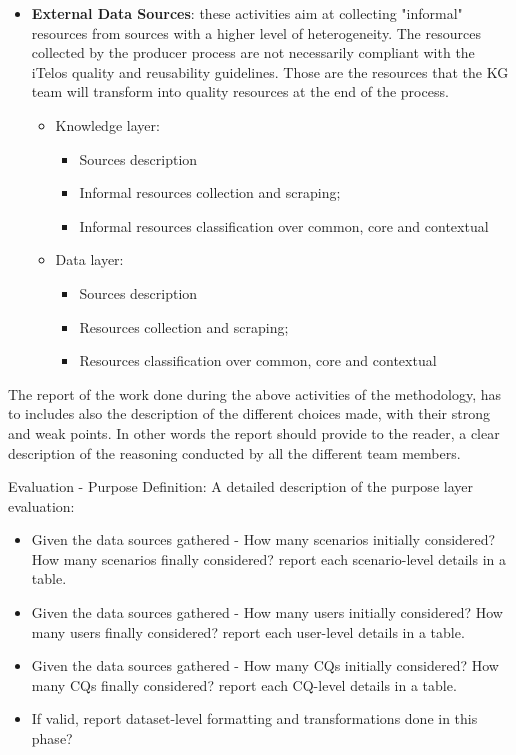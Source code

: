 \begin{itemize}
    \item \textbf{External Data Sources}: these activities aim at collecting "informal" resources from sources with a higher level of heterogeneity. The resources collected by the producer process are not necessarily compliant with the iTelos quality and reusability guidelines. Those are the resources that the KG team will transform into quality resources at the end of the process.
    \begin{itemize}
        \item Knowledge layer:
        \begin{itemize}
            \item Sources description
            \item Informal resources collection and scraping;
            \item Informal resources classification over common, core and contextual
        \end{itemize}
        \item Data layer:
        \begin{itemize}
            \item Sources description
            \item Resources collection and scraping;
            \item Resources classification over common, core and contextual
        \end{itemize}
    \end{itemize}
\end{itemize}

\noindent The report of the work done during the above activities of the methodology, has to includes also the description of the  different choices made, with their strong and weak points. In other words the report should provide to the reader, a clear description of the reasoning conducted by all the different team members.


Evaluation - Purpose Definition: A detailed description of the purpose layer evaluation:
\begin{itemize}
    \item Given the data sources gathered - How many scenarios initially considered? How many scenarios finally considered? report each scenario-level details in a table.
    \item Given the data sources gathered - How many users initially considered? How many users finally considered? report each user-level details in a table.
    \item Given the data sources gathered - How many CQs initially considered? How many CQs finally considered? report each CQ-level details in a table.
    \item If valid, report dataset-level formatting and transformations done in this phase?
\end{itemize}